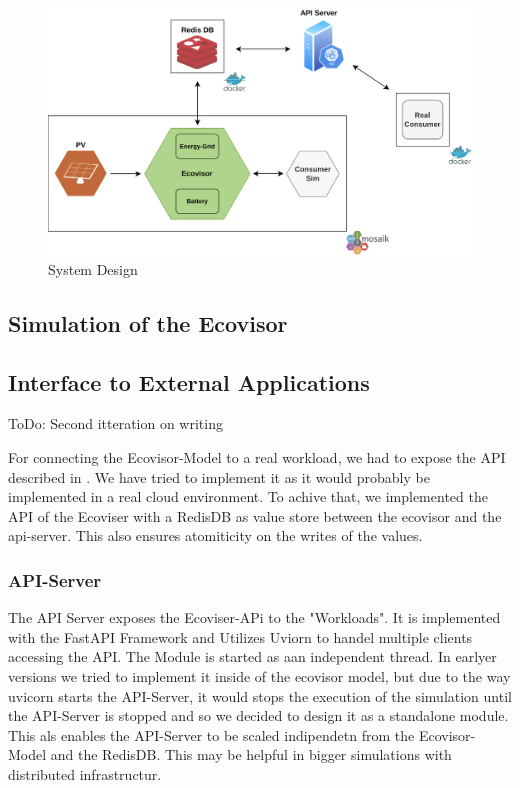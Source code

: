 
\begin{figure}
    \centering
    \includegraphics[width=\linewidth]{figures/system_design}
    \caption{System Design}
    \label{fig:system_design}
\end{figure}

\subsection{Simulation of the Ecovisor}

\subsection{Interface to External Applications}
ToDo: Second itteration on writing

For connecting the Ecovisor-Model to a real workload, we had to expose the API described in \cite{souza2023}. We have tried to implement it as it would probably be implemented in a real cloud environment. %
To achive that, we implemented the API of the Ecoviser with a RedisDB as value store between the ecovisor and the api-server. This also ensures atomiticity on the writes of the values. %



\subsubsection{API-Server}
The API Server exposes the Ecoviser-APi to the "Workloads". It is implemented with the FastAPI Framework and Utilizes Uviorn to handel multiple clients accessing the API.
The Module is started as aan independent thread. In earlyer versions we tried to implement it inside of the ecovisor model, but due to the way uvicorn starts the API-Server,
it would stops the execution of the simulation until the API-Server is stopped and so we decided to design it as a standalone module. This als enables the API-Server to be scaled indipendetn from
the Ecovisor-Model and the RedisDB. This may be helpful in bigger simulations with distributed infrastructur. 


